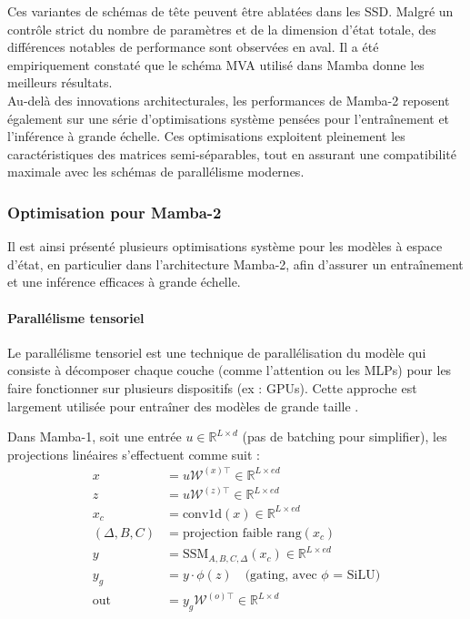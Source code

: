 Ces variantes de schémas de tête peuvent être ablatées dans les SSD. Malgré un contrôle strict du nombre de paramètres et de la dimension d’état totale, des différences notables de performance sont observées en aval. Il a été empiriquement constaté que le schéma MVA utilisé dans Mamba donne les meilleurs résultats.\\

Au-delà des innovations architecturales, les performances de Mamba-2 reposent également sur une série d’optimisations système pensées pour l'entraînement et l'inférence à grande échelle. Ces optimisations exploitent pleinement les caractéristiques des matrices semi-séparables, tout en assurant une compatibilité maximale avec les schémas de parallélisme modernes.

\subsubsection{Optimisation pour Mamba-2}

Il est ainsi présenté plusieurs optimisations système pour les modèles à espace d’état, en particulier dans l’architecture Mamba-2, afin d’assurer un entraînement et une inférence efficaces à grande échelle.

\paragraph{Parallélisme tensoriel}

Le parallélisme tensoriel est une technique de parallélisation du modèle qui consiste à décomposer chaque couche (comme l’attention ou les MLPs) pour les faire fonctionner sur plusieurs dispositifs (ex : GPUs). Cette approche est largement utilisée pour entraîner des modèles de grande taille \citep{shoeybi2019megatron, brown2020gpt3, chowdhery2023palm, touvron2023llama}.

\newpage

Dans Mamba-1, soit une entrée $u \in \mathbb{R}^{L \times d}$ (pas de batching pour simplifier), les projections linéaires s’effectuent comme suit :
\begin{align*}
    x &= u \mathcal{W}^{(x)\top} \in \mathbb{R}^{L \times ed} \\
    z &= u \mathcal{W}^{(z)\top} \in \mathbb{R}^{L \times ed} \\
    x_c &= \text{conv1d}(x) \in \mathbb{R}^{L \times ed} \\
    (\Delta, B, C) &= \text{projection faible rang}(x_c) \\
    y &= \text{SSM}_{A,B,C,\Delta}(x_c) \in \mathbb{R}^{L \times ed} \\
    y_g &= y \cdot \phi(z) \quad \text{(gating, avec $\phi$ = SiLU)} \\
    \text{out} &= y_g \mathcal{W}^{(o)\top} \in \mathbb{R}^{L \times d}
\end{align*}

